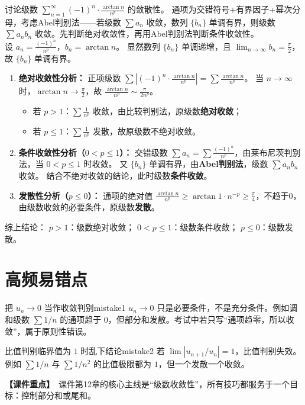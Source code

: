 \documentclass[UTF8,zihao=-4,openany]{ctexbook}
\newcommand{\coursekey}{\textcolor{deeporange}{\bfseries【课件重点】}}
\begin{document}
\begin{example}{}{}
讨论级数 $\sum_{n=1}^\infty (-1)^n \cdot \frac{\arctan n}{n^p}$ 的敛散性。
\tcblower
通项为交错符号+有界因子+幂次分母，考虑Abel判别法——若级数 $\sum a_n$ 收敛，数列 $\{b_n\}$ 单调有界，则级数 $\sum a_n b_n$ 收敛。先判断绝对收敛性，再用Abel判别法判断条件收敛性。\\
设 $a_n = \frac{(-1)^n}{n^p}$，$b_n = \arctan n$。
显然数列 $\{b_n\}$ 单调递增，且 $\lim_{n\to\infty} b_n = \frac{\pi}{2}$，故 $\{b_n\}$ 单调有界。

\begin{enumerate}
    \item \textbf{绝对收敛性分析：}
    正项级数 $\sum \left| (-1)^n \cdot \frac{\arctan n}{n^p} \right| = \sum \frac{\arctan n}{n^p}$。
    当 $n\to\infty$ 时，$\arctan n \to \frac{\pi}{2}$，故 $\frac{\arctan n}{n^p} \sim \frac{\pi}{2 n^p}$。
    \begin{itemize}
        \item 若 $p>1$：$\sum \frac{1}{n^p}$ 收敛，由比较判别法，原级数\textbf{绝对收敛}；
        \item 若 $p\leq1$：$\sum \frac{1}{n^p}$ 发散，故原级数不绝对收敛。
    \end{itemize}

    \item \textbf{条件收敛性分析（$0 < p \leq 1$）：}
    交错级数 $\sum a_n = \sum \frac{(-1)^n}{n^p}$，由莱布尼茨判别法，当 $0 < p \leq 1$ 时收敛。
    又 $\{b_n\}$ 单调有界，由\textbf{Abel判别法}，级数 $\sum a_n b_n$ 收敛。
    结合不绝对收敛的结论，此时级数\textbf{条件收敛}。

    \item \textbf{发散性分析（$p \leq 0$）：}
    通项的绝对值 $\frac{\arctan n}{n^p} \geq \arctan 1 \cdot n^{-p} \geq \frac{\pi}{4}$，不趋于0，由级数收敛的必要条件，原级数\textbf{发散}。
\end{enumerate}

综上结论：
 $p > 1$：级数绝对收敛；
 $0 < p \leq 1$：级数条件收敛；
 $p \leq 0$：级数发散。
\end{example}


\section{高频易错点}
\begin{mistake}{把 $u_n\to0$ 当作收敛判别}{mistake1}
$u_n\to0$ 只是必要条件，不是充分条件。例如调和级数 $\sum 1/n$ 的通项趋于 $0$，但部分和发散。考试中若只写“通项趋零，所以收敛”，属于原则性错误。
\end{mistake}
\begin{mistake}{比值判别临界值为 $1$ 时乱下结论}{mistake2}
若 $\lim |u_{n+1}/u_n|=1$，比值判别失效。例如 $\sum 1/n$ 与 $\sum 1/n^2$ 的比值极限都为 $1$，但一个发散一个收敛。
\end{mistake}
\coursekey\ 课件第12章的核心主线是“级数收敛性”，所有技巧都服务于一个目标：控制部分和或尾和。
\end{document}
